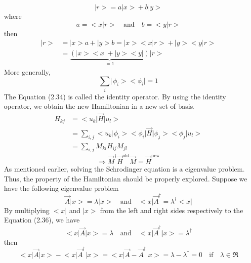 \begin{equation}
    \big|r\big> = a\big|x\big> + b\big|y\big>
\end{equation} where \begin{equation}
    a = \big<x\big|r\big> \quad \text{and} \quad b = \big<y\big|r\big> \nonumber
\end{equation} then \begin{align}
    \big|r\big>& = \big|x\big>a + \big|y\big>b = \big|x\big>\big<x\big|r\big> + \big|y\big>\big<y\big|r\big>\nonumber \\
    & = \underbrace{\left(\big|x\big>\big<x\big| + \big|y\big>\big<y\big|\right)}_{=1}\big|r\big>
\end{align} More generally, \begin{equation}
    \sum_{i}{\big|\phi_{i}\big>\big<\phi_{i}\big|} = 1
\end{equation} The Equation (2.34) is called the identity operator. By using the identity operator, we obtain the new Hamiltonian in a new set of basis. \begin{align}
    H_{kj}& = \big<u_{k}\big|\vec{H}\big|u_{l}\big>\nonumber\\
    & = \sum_{i,j}{\big<u_{k}\big|\phi_{i}\big>\big<\phi_{i}\big|\vec{H}\big|\phi_{j}\big>\big<\phi_{j}\big|u_{l}\big>} \nonumber\\
    & = \sum_{i,j}{M_{ki}H_{ij}M_{jl}} \nonumber
\end{align} \begin{equation}
    \Rightarrow \vec{M}^{\dagger}\vec{H}^{\text{old}}\vec{M} = \vec{H}^{\text{new}}
\end{equation} As mentioned earlier, solving the Schrodinger equation is a eigenvalue problem. Thus, the property of the Hamiltonian should be properly explored. Suppose we have the following eigenvalue problem \begin{equation}
    \vec{A}\big|x\big> = \lambda\big|x\big> \quad \text{and} \quad \big<x\big|\vec{A}^{\dagger} = \lambda^{\dagger}\big<x\big|
\end{equation} By multiplying $\big<x\big|$ and $\big|x\big>$ from the left and right sides respectively to the Equation (2.36), we have \begin{equation}
    \big<x\big|\vec{A}\big|x\big> = \lambda \quad \text{and} \quad \big<x\big|\vec{A}^{\dagger}\big|x\big> = \lambda^{\dagger}
\end{equation} then \begin{equation}
    \big<x\big|\vec{A}\big|x\big> - \big<x\big|\vec{A}^{\dagger}\big|x\big> = \big<x\big|\vec{A}-\vec{A}^{\dagger}\big|x\big> = \lambda - \lambda^{\dagger} = 0 \quad \text{if} \quad \lambda \in \Re \nonumber

\end{equation}

